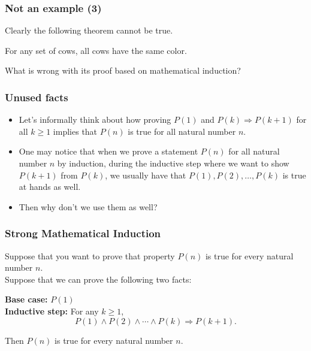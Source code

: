 \begin{frame}\frametitle{Not an example (3)}
  Clearly the following theorem cannot be true.

  \begin{tcolorbox}
    \begin{theorem}
      For any set of cows, all cows have the same color.
    \end{theorem}
  \end{tcolorbox}

  What is wrong with its proof based on mathematical induction?
  
\end{frame}

\begin{frame}\frametitle{Unused facts}
  \begin{itemize}
  \item Let's informally think about how proving $P(1)$ and
    $P(k)\Rightarrow P(k+1)$ for all $k\geq 1$ implies that $P(n)$ is
    true for all natural number $n$.
    \vspace{1.5in}
    \pause
  \item
    One may notice that when we prove a statement $P(n)$ for all
    natural number $n$ by induction, during the inductive step where
    we want to show $P(k+1)$ from $P(k)$, we usually have that
    $P(1),P(2),\ldots,P(k)$ is true at hands as well.
    \pause
  \item Then why don't we use them as well?
  \end{itemize}
\end{frame}

\begin{frame}\frametitle{Strong Mathematical Induction}
  \begin{tcolorbox}[title=Strong Induction]
    Suppose that you want to prove that property $P(n)$ is true for
    every natural number $n$.\\
    
    Suppose that we can prove the following two facts:
    
    {\bf Base case:} $P(1)$ \\
    {\bf Inductive step:} For any $k\geq 1$,
    \[P(1)\wedge P(2)\wedge\cdots\wedge P(k)\Rightarrow P(k+1).\]
    
    Then $P(n)$ is true for every natural number $n$.
  \end{tcolorbox}
\end{frame}

